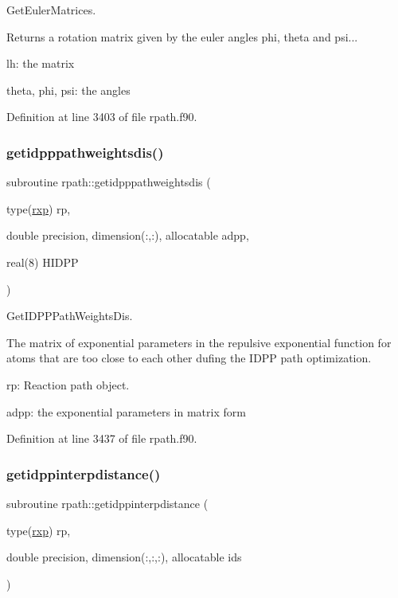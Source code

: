 Get\+Euler\+Matrices. 

Returns a rotation matrix given by the euler angles phi, theta and psi...


\begin{DoxyItemize}
\item lh\+: the matrix
\item theta, phi, psi\+: the angles 
\end{DoxyItemize}

Definition at line 3403 of file rpath.\+f90.

\mbox{\label{namespacerpath_a57a80823cabeccdde83680731d65d88e}} 
\subsubsection{\texorpdfstring{getidpppathweightsdis()}{getidpppathweightsdis()}}
{\footnotesize\ttfamily subroutine rpath\+::getidpppathweightsdis (\begin{DoxyParamCaption}\item[{type(\mbox{\hyperlink{structrpath_1_1rxp}{rxp}})}]{rp,  }\item[{double precision, dimension(\+:,\+:), allocatable}]{adpp,  }\item[{real(8)}]{H\+I\+D\+PP }\end{DoxyParamCaption})}



Get\+I\+D\+P\+P\+Path\+Weights\+Dis. 

The matrix of exponential parameters in the repulsive exponential function for atoms that are too close to each other dufing the I\+D\+PP path optimization.


\begin{DoxyItemize}
\item rp\+: Reaction path object.
\item adpp\+: the exponential parameters in matrix form 
\end{DoxyItemize}

Definition at line 3437 of file rpath.\+f90.

\mbox{\label{namespacerpath_a40c08338c270399cecf65a4f2e6b858d}} 
\subsubsection{\texorpdfstring{getidppinterpdistance()}{getidppinterpdistance()}}
{\footnotesize\ttfamily subroutine rpath\+::getidppinterpdistance (\begin{DoxyParamCaption}\item[{type(\mbox{\hyperlink{structrpath_1_1rxp}{rxp}})}]{rp,  }\item[{double precision, dimension(\+:,\+:,\+:), allocatable}]{ids }\end{DoxyParamCaption})}



